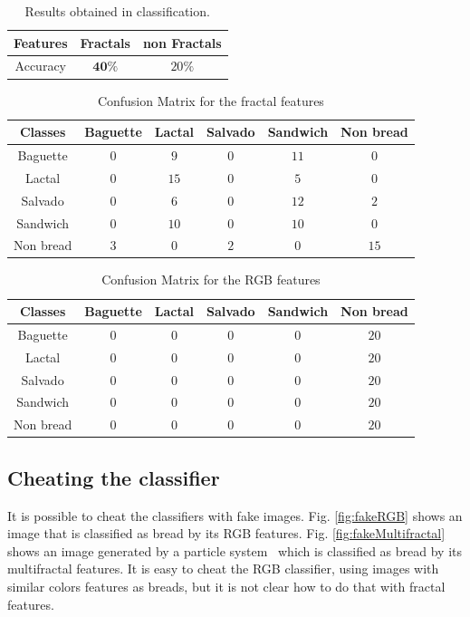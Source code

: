 \documentclass[oneside,a4paper,english,links]{amca}
\begin{document}
\begin{table}[htb]
\centering
\begin{tabular}{|c|c|c|}
    \hline
    Features & Fractals & non Fractals\\
    \hline
    Accuracy  & $\textbf{40}\%$ & $20\%$\\
    \hline
\end{tabular}
\caption{Results obtained in classification. }
\label{table:tableRobustness}
\end{table}


\begin{table}[htb]
\centering
\begin{tabular}{|c|c|c|c|c|c|}
    \hline
    Classes & Baguette & Lactal & Salvado & Sandwich & Non bread\\
    \hline
    Baguette    &   $0$  &   $9$  &   $0$  &  $11$ &   $0$\\
    \hline
    Lactal  & $0$ & $15$ & $0$ & $5$ & $0$\\
    \hline
    Salvado & $0$ & $6$ & $0$ & $12$ & $2$\\
    \hline
    Sandwich  & $0$ & $10$ & $0$ & $10$ & $0$\\
    \hline
    Non bread  & $3$ & $0$ & $2$ & $0$ & $15$\\
    \hline
\end{tabular}
\caption{Confusion Matrix for the fractal features}
\label{table:ConfusionMatrixFractal}
\end{table}

\begin{table}[htb]
\centering
\begin{tabular}{|c|c|c|c|c|c|}
    \hline
    Classes & Baguette & Lactal & Salvado & Sandwich & Non bread\\
    \hline
    Baguette  & $0$ & $0$ & $0$ & $0$ & $20$\\
    \hline
    Lactal  & $0$ & $0$ & $0$ & $0$ & $20$\\
    \hline
    Salvado & $0$ & $0$ & $0$ & $0$ & $20$\\
    \hline
    Sandwich  & $0$ & $0$ & $0$ & $0$ & $20$\\
    \hline
    Non bread  & $0$ & $0$ & $0$ & $0$ & $20$\\
    \hline
\end{tabular}
\caption{Confusion Matrix for the RGB features}
\label{table:ConfusionMatrixNonFractal}
\end{table}

\subsection{Cheating the classifier}
It is possible to cheat the classifiers with fake images. Fig. \ref{fig:fakeRGB} shows an image that is classified as bread by its RGB features. Fig. \ref{fig:fakeMultifractal} shows an image generated by a particle system~\cite{Baravalle2011} which is classified as bread by its multifractal features. It is easy to cheat the RGB classifier, using images with similar colors features as breads, but it is not clear how to do that with fractal features. 
\end{document}
